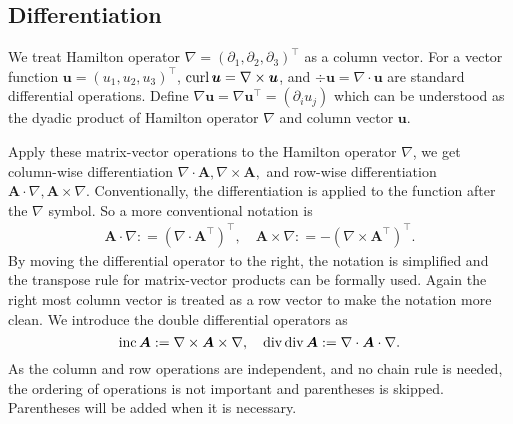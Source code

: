 \subsection{Differentiation}

We treat Hamilton operator $\nabla = (\partial_1, \partial_2, \partial_3)^{\intercal}$ as a column vector. 
For a vector function $\boldsymbol  u = (u_1, u_2, u_3)^{\intercal}$, $\operatorname{curl} \boldsymbol  u= \nabla \times \boldsymbol  u$, and $\div \boldsymbol  u = \nabla \cdot \boldsymbol  u$ are standard differential operations. Define $\nabla \boldsymbol  u = \nabla \boldsymbol  u^{\intercal} = (\partial_i u_j)$ which can be understood as the dyadic product of Hamilton operator $\nabla$ and column vector $\boldsymbol  u$.  


Apply these matrix-vector operations to the Hamilton operator $\nabla$, we get column-wise differentiation $\nabla \cdot \boldsymbol  A, \nabla \times \boldsymbol  A,$
and row-wise differentiation
$\boldsymbol  A\cdot \nabla, \boldsymbol  A\times \nabla.$ Conventionally, the differentiation is applied to the function after the $\nabla$ symbol. So a more conventional notation is
\begin{align*}
\boldsymbol  A\cdot \nabla  : = (\nabla \cdot \boldsymbol  A^{\intercal})^{\intercal}, \quad \boldsymbol  A\times \nabla : = - (\nabla \times \boldsymbol  A^{\intercal})^{\intercal}.
\end{align*}
By moving the differential operator to the right, the notation is simplified and the transpose rule for matrix-vector products can be formally used. Again the right most column vector is treated as a row vector to make the notation more clean. We introduce the double differential operators as
\begin{equation*}%
\inc \boldsymbol  A : = \nabla \times \boldsymbol  A \times \nabla, \quad \div\div\boldsymbol  A := \nabla\cdot \boldsymbol  A\cdot \nabla.
\end{equation*}
As the column and row operations are independent, and no chain rule is needed, the ordering of operations is not important and parentheses is skipped. Parentheses will be added when it is necessary. 

